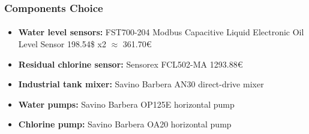\documentclass[12pt]{beamer}
\begin{document}
\begin{frame}
\frametitle{Components Choice}
\framesubtitle{}
\begin{itemize}
    \item \textbf{Water level sensors:} FST700-204 Modbus Capacitive Liquid Electronic Oil Level Sensor 198.54\$ x2 $\approx$ 361.70€
    \item \textbf{Residual chlorine sensor:} Sensorex FCL502-MA 1293.88€
    \item \textbf{Industrial tank mixer:} Savino Barbera AN30 direct-drive mixer
    \item \textbf{Water pumps:} Savino Barbera OP125E horizontal pump
    \item \textbf{Chlorine pump:} Savino Barbera OA20 horizontal pump
\end{itemize}
\end{frame}
\end{document}
